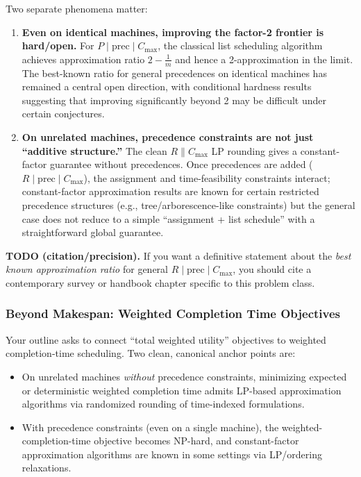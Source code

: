 Two separate phenomena matter:

\begin{enumerate}
\item \textbf{Even on identical machines, improving the factor-2 frontier is hard/open.} For \(P\mid \mathrm{prec}\mid C_{\max}\), the classical list scheduling algorithm achieves approximation ratio \(2-\frac{1}{m}\) and hence a 2-approximation in the limit. The best-known ratio for general precedences on identical machines has remained a central open direction, with conditional hardness results suggesting that improving significantly beyond 2 may be difficult under certain conjectures.

\item \textbf{On unrelated machines, precedence constraints are not just ``additive structure.''} The clean \(R\parallel C_{\max}\) LP rounding gives a constant-factor guarantee without precedences. Once precedences are added (\(R\mid \mathrm{prec}\mid C_{\max}\)), the assignment and time-feasibility constraints interact; constant-factor approximation results are known for certain restricted precedence structures (e.g., tree/arborescence-like constraints) but the general case does not reduce to a simple ``assignment + list schedule'' with a straightforward global guarantee.
\end{enumerate}

\textbf{TODO (citation/precision).} If you want a definitive statement about the \emph{best known approximation ratio} for general \(R\mid\mathrm{prec}\mid C_{\max}\), you should cite a contemporary survey or handbook chapter specific to this problem class.

\subsubsection{Beyond Makespan: Weighted Completion Time Objectives}

Your outline asks to connect ``total weighted utility'' objectives to weighted completion-time scheduling. Two clean, canonical anchor points are:

\begin{itemize}
\item On unrelated machines \emph{without} precedence constraints, minimizing expected or deterministic weighted completion time admits LP-based approximation algorithms via randomized rounding of time-indexed formulations.
\item With precedence constraints (even on a single machine), the weighted-completion-time objective becomes NP-hard, and constant-factor approximation algorithms are known in some settings via LP/ordering relaxations.
\end{itemize}

